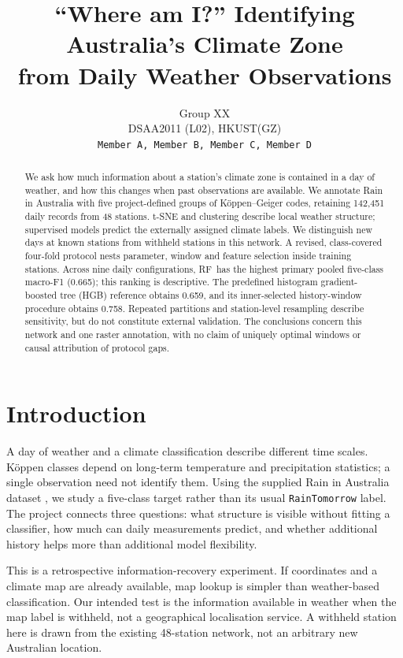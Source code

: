 \documentclass{article}
\title{``Where am I?'' Identifying Australia's Climate Zone\\from Daily Weather Observations}
\author{Group XX\\DSAA2011 (L02), HKUST(GZ)\\\texttt{Member A, Member B, Member C, Member D}}
\newcommand{\DailyHGB}{0.659}
\newcommand{\SelectedWindow}{0.758}
\newcommand{\BestDailyName}{RF}
\newcommand{\BestDailyScore}{0.665}
\begin{document}
\maketitle
\begin{abstract}
We ask how much information about a station's climate zone is contained in a day of weather, and how this changes when past observations are available. We annotate Rain in Australia with five project-defined groups of K\"oppen--Geiger codes, retaining 142,451 daily records from 48 stations. t-SNE and clustering describe local weather structure; supervised models predict the externally assigned climate labels. We distinguish new days at known stations from withheld stations in this network. A revised, class-covered four-fold protocol nests parameter, window and feature selection inside training stations. Across nine daily configurations, \BestDailyName\ has the highest primary pooled five-class macro-F1 (\BestDailyScore); this ranking is descriptive. The predefined histogram gradient-boosted tree (HGB) reference obtains \DailyHGB, and its inner-selected history-window procedure obtains \SelectedWindow. Repeated partitions and station-level resampling describe sensitivity, but do not constitute external validation. The conclusions concern this network and one raster annotation, with no claim of uniquely optimal windows or causal attribution of protocol gaps.
\end{abstract}

\section{Introduction}
A day of weather and a climate classification describe different time scales. K\"oppen classes depend on long-term temperature and precipitation statistics; a single observation need not identify them. Using the supplied Rain in Australia dataset \citep{kaggle}, we study a five-class target rather than its usual \texttt{RainTomorrow} label. The project connects three questions: what structure is visible without fitting a classifier, how much can daily measurements predict, and whether additional history helps more than additional model flexibility.

This is a retrospective information-recovery experiment. If coordinates and a climate map are already available, map lookup is simpler than weather-based classification. Our intended test is the information available in weather when the map label is withheld, not a geographical localisation service. A withheld station here is drawn from the existing 48-station network, not an arbitrary new Australian location.
\end{document}
